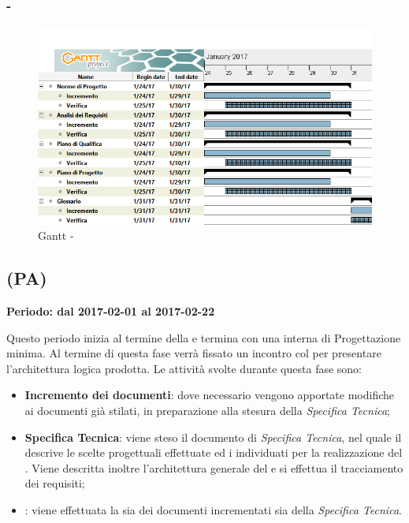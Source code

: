 \documentclass[./PianoDiProgetto.tex]{subfiles}
\begin{document}
  \subsubsection{ - \PerAD}
    \begin{figure}[!h]
    \centering
    \includegraphics[width=\textwidth]{images/AD}
    \caption{Gantt - \PerAD}
    \end{figure}


\subsection{\PerPA{} (PA)}
  \textbf{Periodo: dal 2017-02-01 al 2017-02-22}

  Questo periodo inizia al termine della \PerAD{} e termina con una  interna di \label{Revisione} Progettazione minima. Al termine di questa fase verrà fissato un incontro col  per presentare l'architettura logica prodotta. Le attività svolte durante questa fase sono:
  \begin{itemize}
    \item \textbf{Incremento dei documenti}: dove necessario vengono apportate modifiche ai documenti già stilati, in preparazione alla stesura della \textit{Specifica Tecnica};
    \item \textbf{Specifica Tecnica}: viene steso il documento di \textit{Specifica Tecnica}, nel quale il \PJ{} descrive le scelte progettuali effettuate ed i  individuati per la realizzazione del . Viene descritta inoltre l'architettura generale del  e si effettua il tracciamento dei requisiti;
    \item \textbf{}: viene effettuata la  sia dei documenti incrementati sia della \textit{Specifica Tecnica}.
  \end{itemize}
\end{document}
